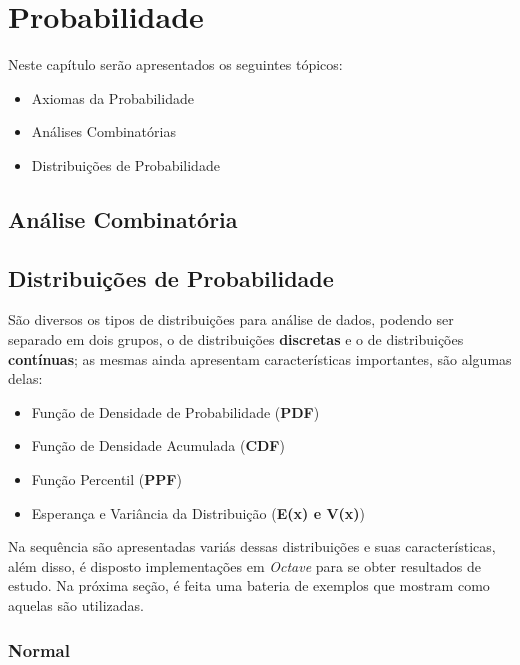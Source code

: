 \documentclass[
]{book}
\providecommand{\tightlist}{%
  \setlength{\itemsep}{0pt}\setlength{\parskip}{0pt}}
\begin{document}
\hypertarget{probabilidade}{%
\chapter{Probabilidade}\label{probabilidade}}

Neste capítulo serão apresentados os seguintes tópicos:

\begin{itemize}
\tightlist
\item
  Axiomas da Probabilidade
\item
  Análises Combinatórias
\item
  Distribuições de Probabilidade
\end{itemize}

\hypertarget{anuxe1lise-combinatuxf3ria}{%
\section{Análise Combinatória}\label{anuxe1lise-combinatuxf3ria}}

\hypertarget{distribuiuxe7uxf5es-de-probabilidade}{%
\section{Distribuições de Probabilidade}\label{distribuiuxe7uxf5es-de-probabilidade}}

São diversos os tipos de distribuições para análise de dados, podendo ser separado em dois grupos, o de distribuições \textbf{discretas} e o de distribuições \textbf{contínuas}; as mesmas ainda apresentam características importantes, são algumas delas:

\begin{itemize}
\tightlist
\item
  Função de Densidade de Probabilidade (\textbf{PDF})
\item
  Função de Densidade Acumulada (\textbf{CDF})
\item
  Função Percentil (\textbf{PPF})
\item
  Esperança e Variância da Distribuição (\textbf{E(x) e V(x)})
\end{itemize}

Na sequência são apresentadas variás dessas distribuições e suas características, além disso, é disposto implementações em \emph{Octave} para se obter resultados de estudo. Na próxima seção, é feita uma bateria de exemplos que mostram como aquelas são utilizadas.

\hypertarget{normal}{%
\subsection{Normal}\label{normal}}
\end{document}
